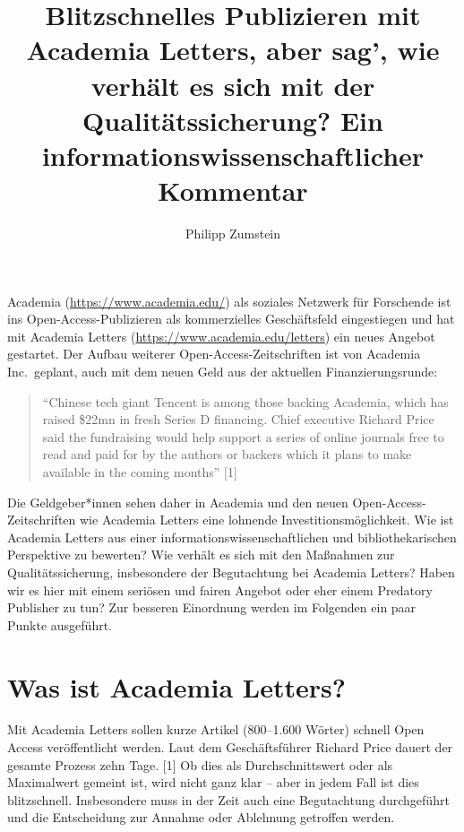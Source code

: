 \documentclass[a4paper,
fontsize=11pt,
oneside,
numbers=noperiodatend,
parskip=half-,
bibliography=totoc,
final
]{scrartcl}
\title{\LARGE{Blitzschnelles Publizieren mit Academia Letters, aber sag', wie verhält es sich mit der Qualitätssicherung? Ein informationswissenschaftlicher Kommentar}}%
\author{Philipp Zumstein} %
\date{}
\begin{document}
\maketitle
\thispagestyle{fancyplain} 


Academia (\url{https://www.academia.edu/}) als soziales Netzwerk für
Forschende ist ins Open-Access-Publizieren als kommerzielles
Geschäftsfeld eingestiegen und hat mit Academia Letters
(\url{https://www.academia.edu/letters}) ein neues Angebot gestartet.
Der Aufbau weiterer Open-Access-Zeitschriften ist von Academia
Inc.~geplant, auch mit dem neuen Geld aus der aktuellen
Finanzierungsrunde:

\begin{quote}
\enquote{Chinese tech giant Tencent is among those backing Academia,
which has raised \$22mn in fresh Series D financing. Chief executive
Richard Price said the fundraising would help support a series of online
journals free to read and paid for by the authors or backers which it
plans to make available in the coming months} {[}1{]}
\end{quote}

Die Geldgeber*innen sehen daher in Academia und den neuen
Open-Access-Zeitschriften wie Academia Letters eine lohnende
Investitionsmöglichkeit. Wie ist Academia Letters aus einer
informationswissenschaftlichen und bibliothekarischen Perspektive zu
bewerten? Wie verhält es sich mit den Maßnahmen zur Qualitätssicherung,
insbesondere der Begutachtung bei Academia Letters? Haben wir es hier
mit einem seriösen und fairen Angebot oder eher einem Predatory
Publisher zu tun? Zur besseren Einordnung werden im Folgenden ein paar
Punkte ausgeführt.

\hypertarget{was-ist-academia-letters}{%
\section{Was ist Academia Letters?}\label{was-ist-academia-letters}}

Mit Academia Letters sollen kurze Artikel (800--1.600 Wörter) schnell
Open Access veröffentlicht werden. Laut dem Geschäftsführer Richard
Price dauert der gesamte Prozess zehn Tage. {[}1{]} Ob dies als
Durchschnittswert oder als Maximalwert gemeint ist, wird nicht ganz klar
-- aber in jedem Fall ist dies blitzschnell. Insbesondere muss in der
Zeit auch eine Begutachtung durchgeführt und die Entscheidung zur
Annahme oder Ablehnung getroffen werden.
\end{document}
